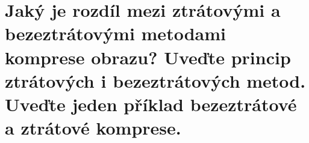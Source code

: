 \section{Jaký je rozdíl mezi ztrátovými a bezeztrátovými metodami komprese obrazu? Uveďte princip ztrátových i 
bezeztrátových metod. Uveďte jeden příklad bezeztrátové a ztrátové komprese.}